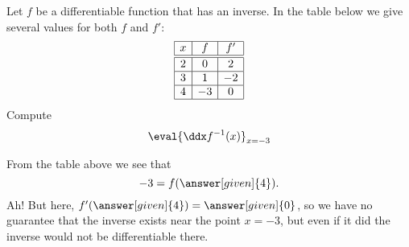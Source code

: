 \documentclass{ximera}
\begin{document}
\begin{example}
  Let $f$ be a differentiable function that has an inverse. In the
  table below we give several values for both $f$ and $f'$:
  \[
  \begin{array}{|c|c|c|}\hline
    x & f  & f' \\ \hline \hline
    2 & 0  & 2  \\ \hline
    3 & 1  & -2 \\ \hline
    4 & -3 & 0  \\ \hline
  \end{array}
  \]
  Compute
  \[
  \eval{\ddx f^{-1}(x)}_{x=-3}
  \]
  \begin{explanation}
    From the table above we see that
    \[
    -3 = f(\answer[given]{4}).
    \]
    Ah! But here, $f'(\answer[given]{4}) = \answer[given]{0}$, so we have no guarantee that the
    inverse exists near the point $x=-3$, but even if it did the inverse would not be differentiable there.
      \end{explanation}
\end{example}
\end{document}
